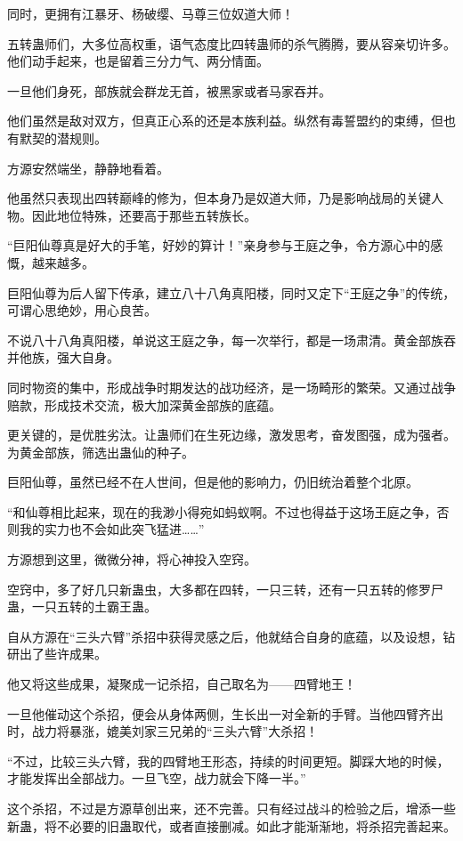 \begin{this_body}
同时，更拥有江暴牙、杨破缨、马尊三位奴道大师！

五转蛊师们，大多位高权重，语气态度比四转蛊师的杀气腾腾，要从容亲切许多。他们动手起来，也是留着三分力气、两分情面。

一旦他们身死，部族就会群龙无首，被黑家或者马家吞并。

他们虽然是敌对双方，但真正心系的还是本族利益。纵然有毒誓盟约的束缚，但也有默契的潜规则。

方源安然端坐，静静地看着。

他虽然只表现出四转巅峰的修为，但本身乃是奴道大师，乃是影响战局的关键人物。因此地位特殊，还要高于那些五转族长。

“巨阳仙尊真是好大的手笔，好妙的算计！”亲身参与王庭之争，令方源心中的感慨，越来越多。

巨阳仙尊为后人留下传承，建立八十八角真阳楼，同时又定下“王庭之争”的传统，可谓心思绝妙，用心良苦。

不说八十八角真阳楼，单说这王庭之争，每一次举行，都是一场肃清。黄金部族吞并他族，强大自身。

同时物资的集中，形成战争时期发达的战功经济，是一场畸形的繁荣。又通过战争赔款，形成技术交流，极大加深黄金部族的底蕴。

更关键的，是优胜劣汰。让蛊师们在生死边缘，激发思考，奋发图强，成为强者。为黄金部族，筛选出蛊仙的种子。

巨阳仙尊，虽然已经不在人世间，但是他的影响力，仍旧统治着整个北原。

“和仙尊相比起来，现在的我渺小得宛如蚂蚁啊。不过也得益于这场王庭之争，否则我的实力也不会如此突飞猛进……”

方源想到这里，微微分神，将心神投入空窍。

空窍中，多了好几只新蛊虫，大多都在四转，一只三转，还有一只五转的修罗尸蛊，一只五转的土霸王蛊。

自从方源在“三头六臂”杀招中获得灵感之后，他就结合自身的底蕴，以及设想，钻研出了些许成果。

他又将这些成果，凝聚成一记杀招，自己取名为——四臂地王！

一旦他催动这个杀招，便会从身体两侧，生长出一对全新的手臂。当他四臂齐出时，战力将暴涨，媲美刘家三兄弟的“三头六臂”大杀招！

“不过，比较三头六臂，我的四臂地王形态，持续的时间更短。脚踩大地的时候，才能发挥出全部战力。一旦飞空，战力就会下降一半。”

这个杀招，不过是方源草创出来，还不完善。只有经过战斗的检验之后，增添一些新蛊，将不必要的旧蛊取代，或者直接删减。如此才能渐渐地，将杀招完善起来。


\end{this_body}
